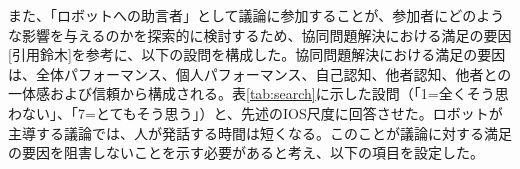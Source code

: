 \documentclass[11pt, a4paper]{jreport} %
\begin{document}

また、「ロボットへの助言者」として議論に参加することが、参加者にどのような影響を与えるのかを探索的に検討するため、協同問題解決における満足の要因[引用鈴木]を参考に、以下の設問を構成した。協同問題解決における満足の要因は、全体パフォーマンス、個人パフォーマンス、自己認知、他者認知、他者との一体感および信頼から構成される。表\ref{tab:search}に示した設問（「1=全くそう思わない」、「7=とてもそう思う」）と、先述のIOS尺度に回答させた。ロボットが主導する議論では、人が発話する時間は短くなる。このことが議論に対する満足の要因を阻害しないことを示す必要があると考え、以下の項目を設定した。
\end{document}
